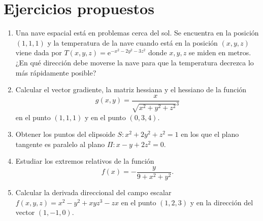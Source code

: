\section{Ejercicios propuestos}

\begin{enumerate}[leftmargin=*]

\item Una nave espacial está en problemas cerca del sol. 
Se encuentra en la posición $(1,1,1)$ y la temperatura de la nave cuando está en la posición $(x,y,z)$ viene dada por
$T(x,y,z)=\mbox{e}^{-x^2-2y^2-3z^2}$ donde $x,y,z$ se miden en metros.
¿En qué dirección debe moverse la nave para que la temperatura decrezca lo más rápidamente posible?

\item Calcular el vector gradiente, la matriz hessiana y el hessiano de la función
\[
g(x,y) = \frac{x}{\sqrt{x^2+y^2+z^2}^3}
\]
en el punto $(1,1,1)$ y en el punto $(0,3,4)$. 

\item Obtener los puntos del elipsoide $S: x^2+2y^2+z^2=1$ en los que el plano tangente es paralelo al plano $\Pi:
x-y+2z^2=0$.

\item Estudiar los extremos relativos de la función 
\[
f(x)=-\frac{y}{9+x^2+y^2}.
\]

\item Calcular la derivada direccional del campo escalar $f(x,y,z)=x^2-y^2+xyz^3-zx$ en el punto $(1,2,3)$ y en la
dirección del vector $(1,-1,0)$.
\end{enumerate}